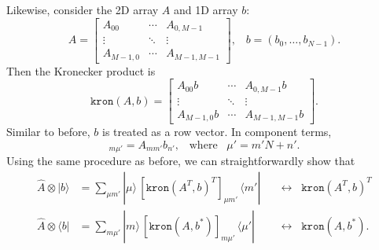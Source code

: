 \documentclass[prx,12pt]{revtex4-2}
\begin{document}
Likewise, consider the 2D array $A$ and 1D array $b$:
\begin{equation}
  A = \begin{bmatrix}A_{00} & \cdots & A_{0,M-1} \\ \vdots & \ddots & \vdots \\ A_{M-1,0} & \cdots & A_{M-1,M-1} \end{bmatrix}, \;\;\;
  b = (b_0, \dots, b_{N-1}).
\end{equation}
Then the Kronecker product is
\begin{equation}
  \texttt{kron}(A, b) =
  \begin{bmatrix}
    A_{00} b & \cdots & A_{0,M-1} b \\
    \vdots & \ddots & \vdots \\
    A_{M-1,0} b & \cdots & A_{M-1,M-1} b
  \end{bmatrix}.
\end{equation}
Similar to before, $b$ is treated as a row vector.  In component
terms,
\begin{equation}
  [\texttt{kron}(A, b)]_{m\mu'} = A_{mm'} b_{n'}, \;\;\;\mathrm{where}\;\;\;
  \mu' = m'N+n'.
\end{equation}
Using the same procedure as before, we can straightforwardly show that
\begin{align}
  \hat{A} \otimes | b\rangle &=
  \sum_{\mu m'} |\mu\rangle \, [\texttt{kron}(A^T, b)^T]_{\mu m'}
  \, \langle m'| && \leftrightarrow \;\; \texttt{kron}(A^T, b)^T\\
  \hat{A} \otimes \langle b| &=
  \sum_{m\mu'} |m\rangle \, [\texttt{kron}(A, b^*)]_{m\mu'}
  \,  \langle \mu'| && \leftrightarrow \;\; \texttt{kron}(A, b^*).
\end{align}
\end{document}
